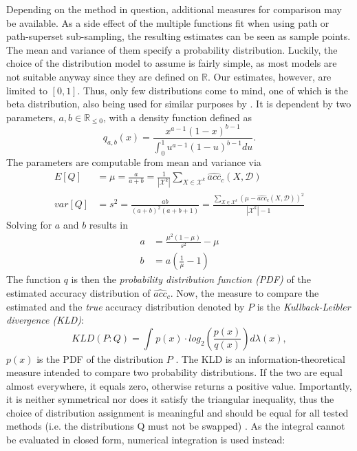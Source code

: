 Depending on the method in question, additional measures for comparison may be available. As a side effect of the multiple functions fit when using path or path-superset sub-sampling, the resulting estimates can be seen as sample points. The mean and variance of them specify a probability distribution. Luckily, the choice of the distribution model to assume is fairly simple, as most models are not suitable anyway since they are defined on $\mathbb{R}$. Our estimates, however, are limited to $[0,1]$. Thus, only few distributions come to mind, one of which is the beta distribution, also being used for similar purposes by \cite{KremplEtAl2014}. It is dependent by two parameters, $a, b \in \mathbb{R}_{\le 0}$, with a density function defined as \cite{GuptaEtAl2004}
\begin{equation}
q_{a, b}(x) = \frac{x^{a-1}(1-x)^{b-1}}{\int_{0}^{1} u^{a-1}(1-u)^{b-1}du}.
\end{equation}
The parameters are computable from mean and variance via
\begin{equation}
\begin{split}
E[Q] &= \mu = \frac{a}{a+b} = \frac{1}{|\mathcal{X}^k|} \sum_{X \in \mathcal{X}^k}^{} \widehat{acc}_c(X, \mathcal{D}) \\
var[Q] &= s^2 = \frac{ab}{(a+b)^2(a+b+1)} = \frac{\sum_{X \in \mathcal{X}^k}^{} (\mu - \widehat{acc}_c(X, \mathcal{D}))^2}{|\mathcal{X}^k|-1}
\end{split}
\end{equation}
Solving for $a$ and $b$ results in
\begin{equation}
\begin{split}
a &= \frac{\mu^2(1-\mu)}{s^2} - \mu \\
b &= a\left(\frac{1}{\mu}-1\right)
\end{split}
\end{equation}
The function $q$ is then the \textit{probability distribution function (PDF)} of the estimated accuracy distribution of $\widehat{acc}_c$. Now, the measure to compare the estimated and the \textit{true} accuracy distribution denoted by $P$ is the \textit{Kullback-Leibler divergence (KLD)}:
\begin{equation}
KLD(P:Q) = \int_{}^{} p(x) \cdot log_2\left(\frac{p(x)}{q(x)}\right) d\lambda (x),
\end{equation}
$p(x)$ is the PDF of the distribution $P$ \cite{KullbackEtAl1951}. The KLD is an information-theoretical measure intended to compare two probability distributions. If the two are equal almost everywhere, it equals zero, otherwise returns a positive value. Importantly, it is neither symmetrical nor does it satisfy the triangular inequality, thus the choice of distribution assignment is meaningful and should be equal for all tested methods (i.e. the distributions Q must not be swapped) \cite{Joyce2011}. As the integral cannot be evaluated in closed form, numerical integration is used instead:

